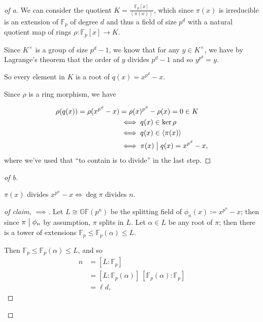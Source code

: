 \begin{solution}

\envlist

\begin{proof}[of a]

We can consider the quotient
\(K = \displaystyle{\frac{{\mathbb{F}}_p[x]}{\left\langle{\pi(x)}\right\rangle}}\),
which since \(\pi(x)\) is irreducible is an extension of
\({\mathbb{F}}_p\) of degree \(d\) and thus a field of size \(p^d\) with
a natural quotient map of rings \(\rho: {\mathbb{F}}_p[x] \to K\).

Since \(K^{\times}\) is a group of size \(p^d-1\), we know that for any
\(y \in K^{\times}\), we have by Lagrange's theorem that the order of
\(y\) divides \(p^d-1\) and so \(y^{p^d} = y\).

So every element in \(K\) is a root of \(q(x) = x^{p^d}-x\).

Since \(\rho\) is a ring morphism, we have

\begin{align*}
\rho(q(x)) = \rho(x^{p^d} - x) &= \rho(x)^{p^d} - \rho(x)
= 0 \in K \\
&\iff q(x) \in \ker \rho \\
&\iff q(x) \in \left\langle{\pi(x)}\right\rangle \\
&\iff \pi(x) \bigm|q(x) = x^{p^d}-x
,\end{align*}
where we've used that ``to contain is to divide'' in the last step.

\end{proof}

\begin{proof}[of b]

\begin{claim}

\(\pi(x)\) divides \(x^{p^n}-x \iff \deg \pi\) divides \(n\).

\end{claim}

\begin{proof}[of claim, $\implies$]

Let \(L \cong {\mathbb{GF}}(p^n)\) be the splitting field of
\(\phi_n(x) \coloneqq x^{p^n}-x\); then since \(\pi \bigm|\phi_n\) by
assumption, \(\pi\) splits in \(L\). Let \(\alpha \in L\) be any root of
\(\pi\); then there is a tower of extensions
\({\mathbb{F}}_p \leq {\mathbb{F}}_p(\alpha) \leq L\).

Then \({\mathbb{F}}_p \leq {\mathbb{F}}_p(\alpha) \leq L\), and so
\begin{align*}
n &= [L: {\mathbb{F}}_p] \\
&= [L: {\mathbb{F}}_p(\alpha)]~[{\mathbb{F}}_p(\alpha): {\mathbb{F}}_p] \\
&= \ell d
,\end{align*}


\end{proof}
\end{proof}
\end{solution}
